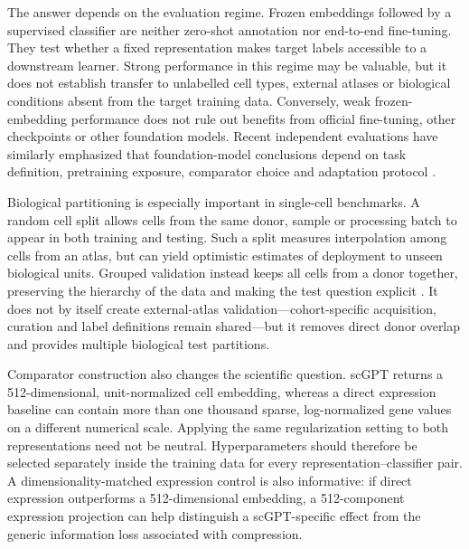 The answer depends on the evaluation regime. Frozen embeddings followed by a supervised classifier are neither zero-shot annotation nor end-to-end fine-tuning. They test whether a fixed representation makes target labels accessible to a downstream learner. Strong performance in this regime may be valuable, but it does not establish transfer to unlabelled cell types, external atlases or biological conditions absent from the target training data. Conversely, weak frozen-embedding performance does not rule out benefits from official fine-tuning, other checkpoints or other foundation models. Recent independent evaluations have similarly emphasized that foundation-model conclusions depend on task definition, pretraining exposure, comparator choice and adaptation protocol \citep{Boiarsky2024,Kedzierska2025}.

Biological partitioning is especially important in single-cell benchmarks. A random cell split allows cells from the same donor, sample or processing batch to appear in both training and testing. Such a split measures interpolation among cells from an atlas, but can yield optimistic estimates of deployment to unseen biological units. Grouped validation instead keeps all cells from a donor together, preserving the hierarchy of the data and making the test question explicit \citep{Roberts2017,Squair2021}. It does not by itself create external-atlas validation---cohort-specific acquisition, curation and label definitions remain shared---but it removes direct donor overlap and provides multiple biological test partitions.

Comparator construction also changes the scientific question. scGPT returns a 512-dimensional, unit-normalized cell embedding, whereas a direct expression baseline can contain more than one thousand sparse, log-normalized gene values on a different numerical scale. Applying the same regularization setting to both representations need not be neutral. Hyperparameters should therefore be selected separately inside the training data for every representation--classifier pair. A dimensionality-matched expression control is also informative: if direct expression outperforms a 512-dimensional embedding, a 512-component expression projection can help distinguish a scGPT-specific effect from the generic information loss associated with compression.

